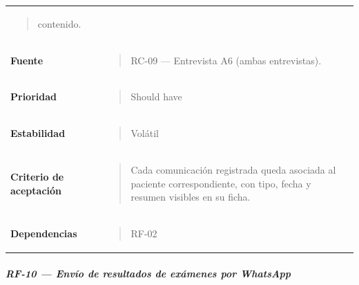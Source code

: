 \documentclass[
]{article}
\begin{document}
{\begin{longtable}[]{@{}
  >{\raggedright\arraybackslash}p{}
  >{\raggedright\arraybackslash}p{}@{}}
\begin{minipage}[t]{\linewidth}
\begin{quote}
contenido.
\end{quote}
\end{minipage} \\
\textbf{Fuente} & \begin{minipage}[t]{\linewidth}\raggedright
\begin{quote}
RC-09 --- Entrevista A6 (ambas entrevistas).
\end{quote}
\end{minipage} \\
\textbf{Prioridad} & \begin{minipage}[t]{\linewidth}\raggedright
\begin{quote}
Should have
\end{quote}
\end{minipage} \\
\textbf{Estabilidad} & \begin{minipage}[t]{\linewidth}\raggedright
\begin{quote}
Volátil
\end{quote}
\end{minipage} \\
\textbf{Criterio de aceptación} &
\begin{minipage}[t]{\linewidth}\raggedright
\begin{quote}
Cada comunicación registrada queda asociada al paciente correspondiente,
con tipo, fecha y resumen visibles en su ficha.
\end{quote}
\end{minipage} \\
\textbf{Dependencias} & \begin{minipage}[t]{\linewidth}\raggedright
\begin{quote}
RF-02
\end{quote}
\end{minipage} \\
\end{longtable}
}

\subparagraph{RF-10 --- Envío de resultados de exámenes por
WhatsApp}\label{rf-10-envuxedo-de-resultados-de-exuxe1menes-por-whatsapp}
\end{document}
